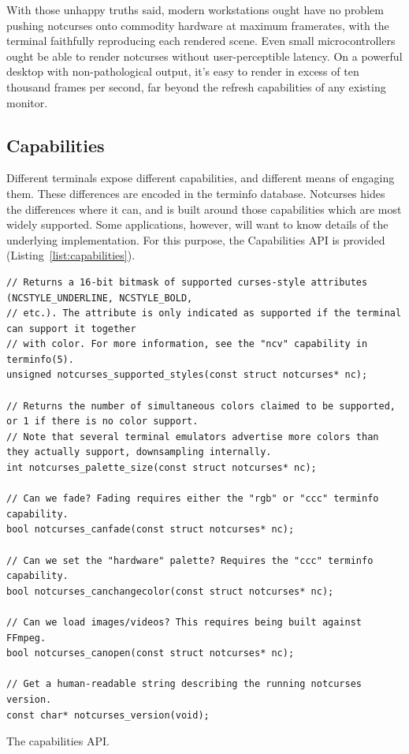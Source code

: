 \documentclass[letterpaper,10pt]{article}
\begin{document}
With those unhappy truths said, modern workstations ought have no problem pushing
notcurses onto commodity hardware at maximum framerates, with the terminal
faithfully reproducing each rendered scene. Even small microcontrollers ought
be able to render notcurses without user-perceptible latency. On a powerful
desktop with non-pathological output, it's easy to render in excess of
ten thousand frames per second, far beyond the refresh capabilities of any
existing monitor.

\subsection{Capabilities}
\label{sec:capabilities}
Different terminals expose different capabilities, and different means of
engaging them. These differences are encoded in the terminfo database\cite{terminfo}.
Notcurses hides the differences where it can, and is built around those
capabilities which are most widely supported. Some applications, however, will
want to know details of the underlying implementation. For this purpose, the
Capabilities API is provided (Listing~\ref{list:capabilities}).
\begin{listing}[!htb]
\begin{verbatim}
// Returns a 16-bit bitmask of supported curses-style attributes (NCSTYLE_UNDERLINE, NCSTYLE_BOLD,
// etc.). The attribute is only indicated as supported if the terminal can support it together
// with color. For more information, see the "ncv" capability in terminfo(5).
unsigned notcurses_supported_styles(const struct notcurses* nc);

// Returns the number of simultaneous colors claimed to be supported, or 1 if there is no color support.
// Note that several terminal emulators advertise more colors than they actually support, downsampling internally.
int notcurses_palette_size(const struct notcurses* nc);

// Can we fade? Fading requires either the "rgb" or "ccc" terminfo capability.
bool notcurses_canfade(const struct notcurses* nc);

// Can we set the "hardware" palette? Requires the "ccc" terminfo capability.
bool notcurses_canchangecolor(const struct notcurses* nc);

// Can we load images/videos? This requires being built against FFmpeg.
bool notcurses_canopen(const struct notcurses* nc);

// Get a human-readable string describing the running notcurses version.
const char* notcurses_version(void);
\end{verbatim}
\caption{The capabilities API.}
\label{list:capabilities}
\end{listing}
\end{document}
